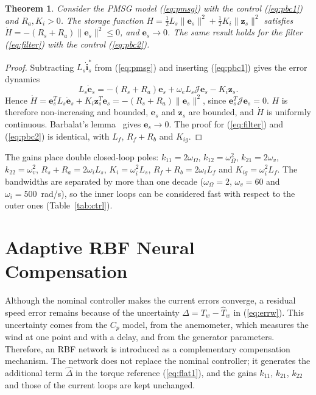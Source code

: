 \documentclass[11pt,a4paper]{article}
\newtheorem{theorem}{Theorem}
\newcommand{\bv}[1]{\mathbf{#1}}
\newcommand{\Jm}{\boldsymbol{\mathcal{J}}}
\begin{document}
\begin{theorem}
Consider the PMSG model (\ref{eq:pmsg}) with the control (\ref{eq:pbc1}) and $R_a,K_i>0$. The storage
function $H=\frac12L_s\|\bv{e}_s\|^2+\frac12K_i\|\bv{z}_s\|^2$ satisfies
$\dot H=-(R_s+R_a)\|\bv{e}_s\|^2\le0$, and $\bv{e}_s\to0$. The same result holds for the filter
(\ref{eq:filter}) with the control (\ref{eq:pbc2}).
\end{theorem}
\begin{proof}
Subtracting $L_s\dot{\bv{i}}_s^*$ from (\ref{eq:pmsg}) and inserting (\ref{eq:pbc1}) gives the error
dynamics
\begin{equation}
L_s\dot{\bv{e}}_s=-(R_s+R_a)\bv{e}_s+\omega_eL_s\Jm\bv{e}_s-K_i\bv{z}_s .
\end{equation}
Hence $\dot H=\bv{e}_s^TL_s\dot{\bv{e}}_s+K_i\bv{z}_s^T\bv{e}_s=-(R_s+R_a)\|\bv{e}_s\|^2$, since
$\bv{e}_s^T\Jm\bv{e}_s=0$. $H$ is therefore non-increasing and bounded, $\bv{e}_s$ and $\bv{z}_s$ are
bounded, and $\dot H$ is uniformly continuous. Barbalat's lemma~\cite{khalil2002} gives
$\bv{e}_s\to0$. The proof for (\ref{eq:filter}) and (\ref{eq:pbc2}) is identical, with $L_f$, $R_f+R_b$
and $K_{ig}$.
\end{proof}

The gains place double closed-loop poles: $k_{11}=2\omega_\Omega$, $k_{12}=\omega_\Omega^2$,
$k_{21}=2\omega_v$, $k_{22}=\omega_v^2$, $R_s+R_a=2\omega_iL_s$, $K_i=\omega_i^2L_s$,
$R_f+R_b=2\omega_iL_f$ and $K_{ig}=\omega_i^2L_f$. The bandwidths are separated by more than one decade
($\omega_\Omega=2$, $\omega_v=60$ and $\omega_i=500$~rad/s), so the inner loops can be considered fast
with respect to the outer ones (Table~\ref{tab:ctrl}).

\section{Adaptive RBF Neural Compensation}
Although the nominal controller makes the current errors converge, a residual speed error remains
because of the uncertainty $\Delta=T_w-\hat T_w$ in (\ref{eq:errw}). This uncertainty comes from the
$C_p$ model, from the anemometer, which measures the wind at one point and with a delay, and from the
generator parameters. Therefore, an RBF network is introduced as a complementary compensation
mechanism. The network does not replace the nominal controller; it generates the additional term
$\hat\Delta$ in the torque reference (\ref{eq:flat1}), and the gains $k_{11}$, $k_{21}$, $k_{22}$ and
those of the current loops are kept unchanged.
\end{document}
